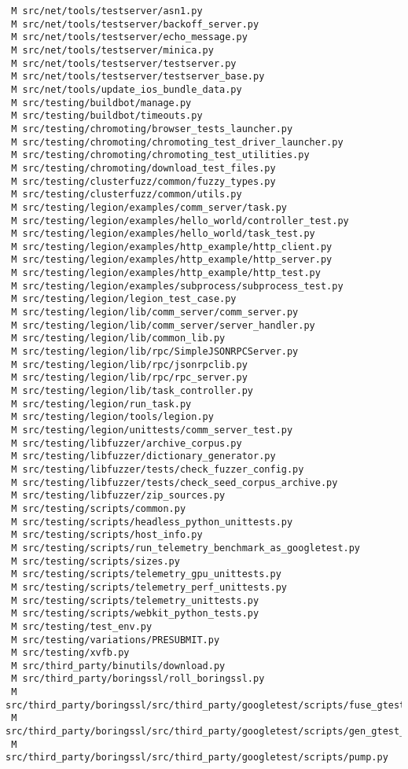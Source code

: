 \documentclass{article}
\begin{document}
\begin{verbatim}
 M src/net/tools/testserver/asn1.py
 M src/net/tools/testserver/backoff_server.py
 M src/net/tools/testserver/echo_message.py
 M src/net/tools/testserver/minica.py
 M src/net/tools/testserver/testserver.py
 M src/net/tools/testserver/testserver_base.py
 M src/net/tools/update_ios_bundle_data.py
 M src/testing/buildbot/manage.py
 M src/testing/buildbot/timeouts.py
 M src/testing/chromoting/browser_tests_launcher.py
 M src/testing/chromoting/chromoting_test_driver_launcher.py
 M src/testing/chromoting/chromoting_test_utilities.py
 M src/testing/chromoting/download_test_files.py
 M src/testing/clusterfuzz/common/fuzzy_types.py
 M src/testing/clusterfuzz/common/utils.py
 M src/testing/legion/examples/comm_server/task.py
 M src/testing/legion/examples/hello_world/controller_test.py
 M src/testing/legion/examples/hello_world/task_test.py
 M src/testing/legion/examples/http_example/http_client.py
 M src/testing/legion/examples/http_example/http_server.py
 M src/testing/legion/examples/http_example/http_test.py
 M src/testing/legion/examples/subprocess/subprocess_test.py
 M src/testing/legion/legion_test_case.py
 M src/testing/legion/lib/comm_server/comm_server.py
 M src/testing/legion/lib/comm_server/server_handler.py
 M src/testing/legion/lib/common_lib.py
 M src/testing/legion/lib/rpc/SimpleJSONRPCServer.py
 M src/testing/legion/lib/rpc/jsonrpclib.py
 M src/testing/legion/lib/rpc/rpc_server.py
 M src/testing/legion/lib/task_controller.py
 M src/testing/legion/run_task.py
 M src/testing/legion/tools/legion.py
 M src/testing/legion/unittests/comm_server_test.py
 M src/testing/libfuzzer/archive_corpus.py
 M src/testing/libfuzzer/dictionary_generator.py
 M src/testing/libfuzzer/tests/check_fuzzer_config.py
 M src/testing/libfuzzer/tests/check_seed_corpus_archive.py
 M src/testing/libfuzzer/zip_sources.py
 M src/testing/scripts/common.py
 M src/testing/scripts/headless_python_unittests.py
 M src/testing/scripts/host_info.py
 M src/testing/scripts/run_telemetry_benchmark_as_googletest.py
 M src/testing/scripts/sizes.py
 M src/testing/scripts/telemetry_gpu_unittests.py
 M src/testing/scripts/telemetry_perf_unittests.py
 M src/testing/scripts/telemetry_unittests.py
 M src/testing/scripts/webkit_python_tests.py
 M src/testing/test_env.py
 M src/testing/variations/PRESUBMIT.py
 M src/testing/xvfb.py
 M src/third_party/binutils/download.py
 M src/third_party/boringssl/roll_boringssl.py
 M src/third_party/boringssl/src/third_party/googletest/scripts/fuse_gtest_files.py
 M src/third_party/boringssl/src/third_party/googletest/scripts/gen_gtest_pred_impl.py
 M src/third_party/boringssl/src/third_party/googletest/scripts/pump.py

\end{verbatim}
\end{document}
